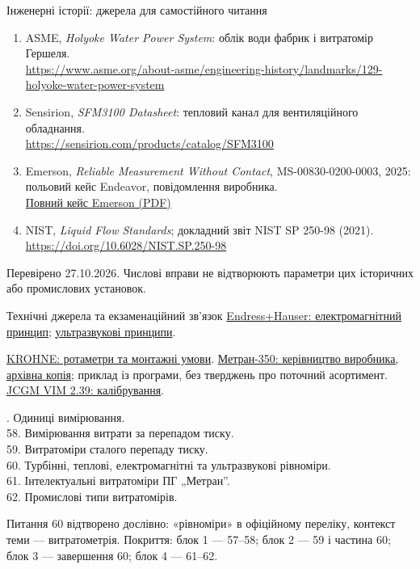 \documentclass[aspectratio=169,11pt]{beamer}
\begin{document}
\begin{frame}{Інженерні історії: джерела для самостійного читання}
\footnotesize
\begin{enumerate}
\item ASME, \textit{Holyoke Water Power System}: облік води фабрик і витратомір Гершеля.\\
\url{https://www.asme.org/about-asme/engineering-history/landmarks/129-holyoke-water-power-system}
\item Sensirion, \textit{SFM3100 Datasheet}: тепловий канал для вентиляційного обладнання.\\
\url{https://sensirion.com/products/catalog/SFM3100}
\item Emerson, \textit{Reliable Measurement Without Contact}, MS-00830-0200-0003, 2025: польовий кейс Endeavor, повідомлення виробника.\\
\href{https://www.emerson.com/is/content/emerson/en/measurement-instrumentation/marketing/products/flow-non-intrusive-ultrasonic/documents/doc-flexim-00830-0200-0003.pdf}{Повний кейс Emerson (PDF)}
\item NIST, \textit{Liquid Flow Standards}; докладний звіт NIST SP 250-98 (2021).\\
\url{https://doi.org/10.6028/NIST.SP.250-98}
\end{enumerate}
Перевірено 27.10.2026. Числові вправи не відтворюють параметри цих історичних або промислових установок.
\end{frame}
\begin{frame}{Технічні джерела та екзаменаційний зв'язок}
\scriptsize
\href{https://www.hr.endress.com/hr/support-overview/learning-center/flow-measuring-principle-emf}{Endress+Hauser: електромагнітний принцип};
\href{https://www.hr.endress.com/hr/support-overview/learning-center/flow-measuring-principle-ultrasonic-sensors}{ультразвукові принципи}.

\href{https://www.krohne.com/en-vn/products/flow-measurement/flowmeters/variable-area-flowmeters}{KROHNE: ротаметри та монтажні умови}.
\href{https://www.germiona.com.ua/files/-------350.pdf}{Метран-350: керівництво виробника, архівна копія}; приклад із програми, без тверджень про поточний асортимент.
\href{https://jcgm.bipm.org/vim/en/2.39.html}{JCGM VIM 2.39: калібрування}.

. Одиниці вимірювання.\\
58. Вимірювання витрати за перепадом тиску.\\
59. Витратоміри сталого перепаду тиску.\\
60. Турбінні, теплові, електромагнітні та ультразвукові рівноміри.\\
61. Інтелектуальні витратоміри ПГ „Метран”.\\
62. Промислові типи витратомірів.

\medskip
Питання 60 відтворено дослівно: «рівноміри» в офіційному переліку, контекст теми --- витратометрія. Покриття: блок 1 --- 57--58; блок 2 --- 59 і частина 60; блок 3 --- завершення 60; блок 4 --- 61--62.
\end{frame}
\end{document}
